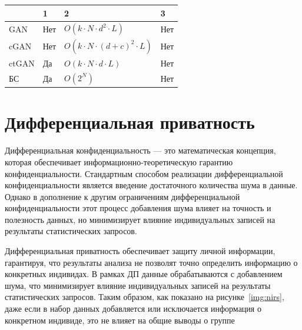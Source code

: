 \begin{tabularx}{0.8\textwidth}{|X|X|X|X|}  %
	\hline
	\space & 1 & 2 & 3 \\
	\hline
	GAN & Нет & $O(k \cdot N \cdot d^2 \cdot L)$ & Нет \\
	\hline
	cGAN & Нет & $O(k \cdot N \cdot (d+c)^2 \cdot L)$ & Нет \\
	\hline
	ctGAN & Да & $O(k \cdot N \cdot d \cdot L)$ & Нет \\
	\hline
	БС & Да & $O(2^N)$ & Нет \\
	\hline
\end{tabularx}
\clearpage
\section{Дифференциальная приватность}

Дифференциальная конфиденциальность --- это математическая концепция, которая обеспечивает информационно-теоретическую гарантию конфиденциальности.
Стандартным способом реализации дифференциальной конфиденциальности является введение достаточного количества шума в данные. Однако в дополнение к другим ограничениям дифференциальной конфиденциальности этот процесс добавления шума влияет на точность и полезность данных, но минимизирует влияние индивидуальных записей на результаты статистических запросов.

Дифференциальная приватность обеспечивает защиту личной информации, гарантируя, что результаты анализа не позволят точно определить информацию о конкретных индивидах. 
В рамках ДП данные обрабатываются с добавлением шума, что минимизирует влияние индивидуальных записей на результаты статистических запросов.
Таким образом, как показано на рисунке~\ref{img:nirs}, даже если в набор данных добавляется или исключается информация о конкретном индивиде, это не влияет на общие выводы о группе%

